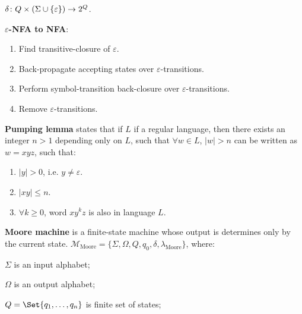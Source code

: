 \documentclass[a4paper,10pt]{article}
\begin{document}
\begin{terms}
    \begin{terms}
        \item $\delta \colon Q \times (\Sigma \cup \{\varepsilon\}) \to 2^Q$.
    \end{terms}

    \item \textbf{$\varepsilon$-NFA to NFA}:
    \begin{enumerate}
        \item Find transitive-closure of $\varepsilon$.

        \item Back-propagate accepting states over $\varepsilon$-transitions.

        \item Perform symbol-transition back-closure over $\varepsilon$-transitions.

        \item Remove $\varepsilon$-transitions.
    \end{enumerate}

    \item \textbf{Pumping lemma} states that if $L$ if a regular language, then there exists an integer $n > 1$ depending only on $L$, such that $\forall w \in L$, $|w| > n$ can be written as $w = xyz$, such that:
    \begin{enumerate}
        \item $|y| > 0$, i.e. $y \neq \varepsilon$.

        \item $|xy| \leq n$.

        \item $\forall k \geq 0$, word $x y^{k} z$ is also in language $L$.
    \end{enumerate}

    \item \textbf{Moore machine} is a finite-state machine whose output is determines only by the current state.
    $\mathcal{M}_\text{Moore} = \{\Sigma, \Omega, Q, q_0, \delta, \lambda_\text{Moore}\}$, where:
    \begin{terms}
        \item $\Sigma$ is an input alphabet;

        \item $\Omega$ is an output alphabet;

        \item $Q = \Set{q_1, \dots, q_n}$ is finite set of states;


\end{terms}
\end{terms}
\end{document}
